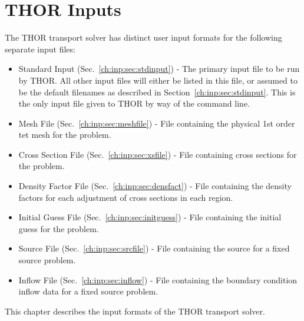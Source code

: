 \section{THOR Inputs}\label{sec:THOR_format}

The THOR transport solver has distinct user input formats for the following separate input files:
\begin{itemize}
    \item Standard Input (Sec.~\ref{ch:inp:sec:stdinput}) - The primary input file to be run by THOR.
    All other input files will either be listed in this file, or assumed to be the default filenames as described in Section~\ref{ch:inp:sec:stdinput}.
    This is the only input file given to THOR by way of the command line.
    \item Mesh File (Sec.~\ref{ch:inp:sec:meshfile}) - File containing the physical 1st order tet mesh for the problem.
    \item Cross Section File (Sec.~\ref{ch:inp:sec:xsfile}) - File containing cross sections for the problem.
    \item Density Factor File (Sec.~\ref{ch:inp:sec:densfact}) - File containing the density factors for each adjustment of cross sections in each region.
    \item Initial Guess File (Sec.~\ref{ch:inp:sec:initguess}) - File containing the initial guess for the problem.
    \item Source File (Sec.~\ref{ch:inp:sec:srcfile}) - File containing the source for a fixed source problem.
    \item Inflow File (Sec.~\ref{ch:inp:sec:inflow}) - File containing the boundary condition inflow data for a fixed source problem.
\end{itemize}

This chapter describes the input formats of the THOR transport solver.

